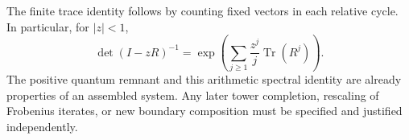 The finite trace identity follows by counting fixed vectors in each
relative cycle. In particular, for $|z|<1$,
\[
 \det(I-zR)^{-1}
 =\exp\!\left(\sum_{j\geq1}\frac{z^j}{j}\operatorname{Tr}(R^j)\right).
\]
The positive quantum remnant and this arithmetic spectral identity are
already properties of an assembled system. Any later tower completion,
rescaling of Frobenius iterates, or new boundary composition must be
specified and justified independently.
